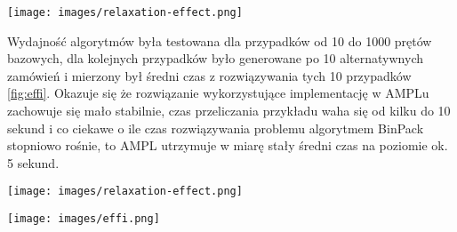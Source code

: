 \begin{figure*}[!ht]
    \begin{center}
        \texttt{[image: images/relaxation-effect.png]}
    \end{center}
    \caption{Relaxation effect on optimal solution}
    \label{fig:relaxation-effect}
\end{figure*}

\FloatBarrier %

Wydajność algorytmów była testowana dla przypadków od 10 do 1000 prętów bazowych, dla kolejnych przypadków było generowane po 10 alternatywnych zamówień i mierzony był średni czas z rozwiązywania tych 10 przypadków \ref{fig:effi}. Okazuje się że rozwiązanie wykorzystujące implementację w AMPLu zachowuje się mało stabilnie, czas przeliczania przykładu waha się od kilku do 10 sekund i co ciekawe o ile czas rozwiązywania problemu algorytmem BinPack stopniowo rośnie, to AMPL utrzymuje w miarę stały średni czas na poziomie ok. 5 sekund.

\begin{figure*}[!ht]
    \begin{center}
        \texttt{[image: images/relaxation-effect.png]}
    \end{center}
    \caption{Relaxation effect on optimal solution}
    \label{fig:relaxation-effect}
\end{figure*}

\begin{figure*}
    \begin{center}
        \texttt{[image: images/effi.png]}
    \end{center}
    \caption{Time efficiency of BinPack and AMPL algorithms}
    \label{fig:effi}
\end{figure*}

\FloatBarrier %
